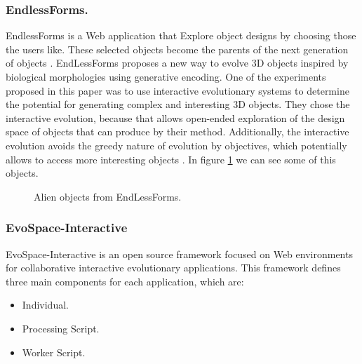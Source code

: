 \subsubsection{EndlessForms.}
EndlessForms is a Web application that Explore object designs by choosing those
the users like. These selected objects become the parents of the next generation
of objects \cite{clune2011evolving}. EndLessForms proposes a new way to evolve
3D objects inspired by biological morphologies using generative encoding. One of
the experiments proposed in this paper was to use interactive evolutionary
systems to determine the potential for generating complex and interesting 3D
objects. They chose the interactive evolution, because that allows open-ended
exploration of the design space of objects that can produce by their method.
Additionally, the interactive evolution avoids the greedy nature of evolution by
objectives, which potentially allows to access more interesting objects
\cite{clune2011evolving}. In figure \ref{fig:EndlessForms} we can see some of
this objects.

\begin{figure}
\captionsetup{justification=centering,margin=2cm}
\centering
\setlength\fboxsep{0pt}
\setlength\fboxrule{0.7pt}
\caption{Alien objects from EndLessForms.}
\label{fig:EndlessForms}
\end{figure}

\subsubsection{EvoSpace-Interactive} EvoSpace-Interactive is an open source
framework focused on Web environments for collaborative interactive evolutionary
applications. This framework defines three main components for each application,
which are:
\begin{itemize}
	\item Individual.
	\item Processing Script.
	\item Worker Script.
\end{itemize}

